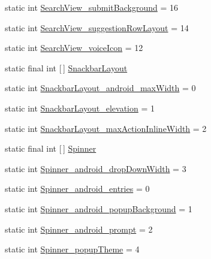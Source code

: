 \begin{DoxyCompactItemize}
\item 
static int \hyperlink{classandroid_1_1support_1_1v7_1_1mediarouter_1_1R_1_1styleable_ae515cfc893e5d3141dabbb0ddfecaa09}{Search\+View\+\_\+submit\+Background} = 16
\item 
static int \hyperlink{classandroid_1_1support_1_1v7_1_1mediarouter_1_1R_1_1styleable_aa17d257e1bac480445b5018c0512ade5}{Search\+View\+\_\+suggestion\+Row\+Layout} = 14
\item 
static int \hyperlink{classandroid_1_1support_1_1v7_1_1mediarouter_1_1R_1_1styleable_a3d6a51de35b16974fa4a58f2beddf32d}{Search\+View\+\_\+voice\+Icon} = 12
\item 
static final int \mbox{[}$\,$\mbox{]} \hyperlink{classandroid_1_1support_1_1v7_1_1mediarouter_1_1R_1_1styleable_a1653efd198ae58b5c9d976b12d23f9a7}{Snackbar\+Layout}
\item 
static int \hyperlink{classandroid_1_1support_1_1v7_1_1mediarouter_1_1R_1_1styleable_ace4981fa4e502194da89b37910aa611c}{Snackbar\+Layout\+\_\+android\+\_\+max\+Width} = 0
\item 
static int \hyperlink{classandroid_1_1support_1_1v7_1_1mediarouter_1_1R_1_1styleable_a1367ffb5eb169f89174a1b2c0d5c78f8}{Snackbar\+Layout\+\_\+elevation} = 1
\item 
static int \hyperlink{classandroid_1_1support_1_1v7_1_1mediarouter_1_1R_1_1styleable_a5dd123494310cce9535c4fb463205145}{Snackbar\+Layout\+\_\+max\+Action\+Inline\+Width} = 2
\item 
static final int \mbox{[}$\,$\mbox{]} \hyperlink{classandroid_1_1support_1_1v7_1_1mediarouter_1_1R_1_1styleable_adb75721ed5a18e76fcd9c38619ce0ac5}{Spinner}
\item 
static int \hyperlink{classandroid_1_1support_1_1v7_1_1mediarouter_1_1R_1_1styleable_ada50bd28e8330a67162fad2ff9914162}{Spinner\+\_\+android\+\_\+drop\+Down\+Width} = 3
\item 
static int \hyperlink{classandroid_1_1support_1_1v7_1_1mediarouter_1_1R_1_1styleable_a5d540e7f1f03b94e5f052572d1221d5d}{Spinner\+\_\+android\+\_\+entries} = 0
\item 
static int \hyperlink{classandroid_1_1support_1_1v7_1_1mediarouter_1_1R_1_1styleable_aea757797202520a71cc660bcc5f29e00}{Spinner\+\_\+android\+\_\+popup\+Background} = 1
\item 
static int \hyperlink{classandroid_1_1support_1_1v7_1_1mediarouter_1_1R_1_1styleable_aefc5f8f841d0a3444bacf4b203f30ade}{Spinner\+\_\+android\+\_\+prompt} = 2
\item 
static int \hyperlink{classandroid_1_1support_1_1v7_1_1mediarouter_1_1R_1_1styleable_a9e887ce78259fc5079eb2c603b3ac56f}{Spinner\+\_\+popup\+Theme} = 4

\end{DoxyCompactItemize}
